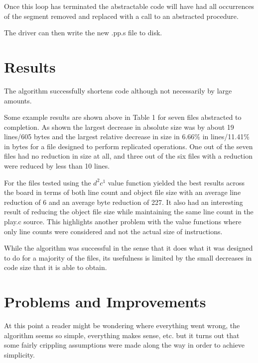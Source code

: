 \documentclass[9pt,nocopyrightspace]{sigplanconf}
\begin{document}
Once this loop has terminated the abstractable code will have had all occurrences of the segment removed and replaced with a call to an abstracted procedure.

The driver can then write the new .pp.s file to disk.

\section{Results}

The algorithm successfully shortens code although not necessarily by large amounts.

Some example results are shown above in Table 1 for seven files abstracted to completion.
As shown the largest decrease in absolute size was by about 19 lines/605 bytes and the largest relative decrease in size in 6.66\% in lines/11.41\% in bytes for a file designed to perform replicated operations.
One out of the seven files had no reduction in size at all, and three out of the six files with a reduction were reduced by less than 10 lines.

For the files tested using the $d^{2}c^{1}$ value function yielded the best results across the board in terms of both line count and object file size with an average line reduction of 6 and an average byte reduction of 227.
It also had an interesting result of reducing the object file size while maintaining the same line count in the play.c source.
This highlights another problem with the value functions where only line counts were considered and not the actual size of instructions.


While the algorithm was successful in the sense that it does what it was designed to do for a majority of the files, its usefulness is limited by the small decreases in code size that it is able to obtain.

\section{Problems and Improvements}

At this point a reader might be wondering where everything went wrong, the algorithm seems so simple, everything makes sense, etc. but it turns out that some fairly crippling assumptions were made along the way in order to achieve simplicity.
\end{document}
